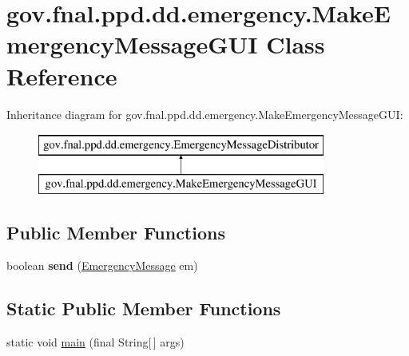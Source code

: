 \hypertarget{classgov_1_1fnal_1_1ppd_1_1dd_1_1emergency_1_1MakeEmergencyMessageGUI}{\section{gov.\-fnal.\-ppd.\-dd.\-emergency.\-Make\-Emergency\-Message\-G\-U\-I Class Reference}
\label{classgov_1_1fnal_1_1ppd_1_1dd_1_1emergency_1_1MakeEmergencyMessageGUI}
}
Inheritance diagram for gov.\-fnal.\-ppd.\-dd.\-emergency.\-Make\-Emergency\-Message\-G\-U\-I\-:\begin{figure}[H]
\begin{center}
\leavevmode
\includegraphics[height=2.000000cm]{classgov_1_1fnal_1_1ppd_1_1dd_1_1emergency_1_1MakeEmergencyMessageGUI}
\end{center}
\end{figure}
\subsection*{Public Member Functions}
\begin{DoxyCompactItemize}
\item 
\hypertarget{classgov_1_1fnal_1_1ppd_1_1dd_1_1emergency_1_1MakeEmergencyMessageGUI_afb44cf215f0085e5a43f07e493f02f21}{boolean {\bfseries send} (\hyperlink{classgov_1_1fnal_1_1ppd_1_1dd_1_1emergency_1_1EmergencyMessage}{Emergency\-Message} em)}\label{classgov_1_1fnal_1_1ppd_1_1dd_1_1emergency_1_1MakeEmergencyMessageGUI_afb44cf215f0085e5a43f07e493f02f21}

\end{DoxyCompactItemize}
\subsection*{Static Public Member Functions}
\begin{DoxyCompactItemize}
\item 
static void \hyperlink{classgov_1_1fnal_1_1ppd_1_1dd_1_1emergency_1_1MakeEmergencyMessageGUI_a8be418fa3e7d67679f1f1d30a9bf48e1}{main} (final String\mbox{[}$\,$\mbox{]} args)
\end{DoxyCompactItemize}



